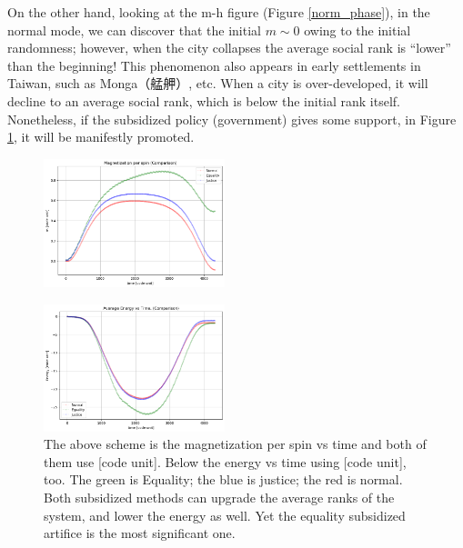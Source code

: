 \documentclass[10pt]{article}
\begin{document}
\begin{multicols}{2}
        On the other hand, looking at the m-h figure (Figure \ref{norm_phase}), in the normal mode, we can discover that the initial $m \sim 0$ owing to the initial randomness; however, when the city collapses the average social rank is ``lower'' than the beginning! This phenomenon also appears in early settlements in Taiwan, such as Monga（艋舺）, etc. When a city is over-developed, it will decline to an average social rank, which is below the initial rank itself. Nonetheless, if the subsidized policy (government) gives some support, in Figure \ref{com}, it will be manifestly promoted.

        \begin{figure}[H]
            \centering
            \includegraphics[width = 0.47\textwidth]{com_mt.png}
        \end{figure}
        \begin{figure}[H]
            \centering   
            \includegraphics[width = 0.47\textwidth]{com_et.png}
            \caption{The above scheme is the magnetization per spin vs time and both of them use [code unit]. Below the energy vs time using [code unit], too. The green is Equality; the blue is justice; the red is normal. Both subsidized methods can upgrade the average ranks of the system, and lower the energy as well. Yet the equality subsidized artifice is the most significant one.}
            \label{com}
        \end{figure}
        

\end{multicols}
\end{document}
